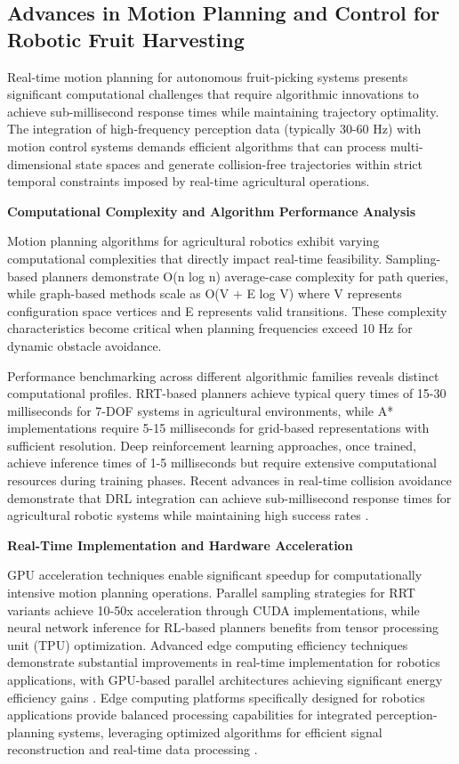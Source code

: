 \documentclass{ieeeaccess}
\begin{document}
\subsection{Advances in Motion Planning and Control for Robotic Fruit Harvesting}
Real-time motion planning for autonomous fruit-picking systems presents significant computational challenges that require algorithmic innovations to achieve sub-millisecond response times while maintaining trajectory optimality. The integration of high-frequency perception data (typically 30-60 Hz) with motion control systems demands efficient algorithms that can process multi-dimensional state spaces and generate collision-free trajectories within strict temporal constraints imposed by real-time agricultural operations.

\textbf{Computational Complexity and Algorithm Performance Analysis}

Motion planning algorithms for agricultural robotics exhibit varying computational complexities that directly impact real-time feasibility. Sampling-based planners demonstrate O(n log n) average-case complexity for path queries, while graph-based methods scale as O(V + E log V) where V represents configuration space vertices and E represents valid transitions. These complexity characteristics become critical when planning frequencies exceed 10 Hz for dynamic obstacle avoidance.

Performance benchmarking across different algorithmic families reveals distinct computational profiles. RRT-based planners achieve typical query times of 15-30 milliseconds for 7-DOF systems in agricultural environments, while A* implementations require 5-15 milliseconds for grid-based representations with sufficient resolution. Deep reinforcement learning approaches, once trained, achieve inference times of 1-5 milliseconds but require extensive computational resources during training phases. Recent advances in real-time collision avoidance demonstrate that DRL integration can achieve sub-millisecond response times for agricultural robotic systems while maintaining high success rates .

\textbf{Real-Time Implementation and Hardware Acceleration}

GPU acceleration techniques enable significant speedup for computationally intensive motion planning operations. Parallel sampling strategies for RRT variants achieve 10-50x acceleration through CUDA implementations, while neural network inference for RL-based planners benefits from tensor processing unit (TPU) optimization. Advanced edge computing efficiency techniques demonstrate substantial improvements in real-time implementation for robotics applications, with GPU-based parallel architectures achieving significant energy efficiency gains \cite{9330509}. Edge computing platforms specifically designed for robotics applications provide balanced processing capabilities for integrated perception-planning systems, leveraging optimized algorithms for efficient signal reconstruction and real-time data processing \cite{10518056}.
\end{document}
